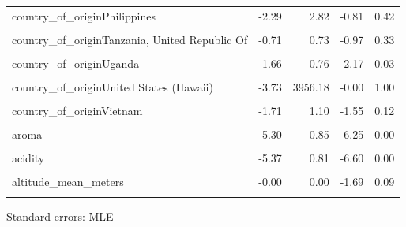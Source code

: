 \documentclass[
  letterpaper,
  DIV=11,
  numbers=noendperiod]{scrartcl}
\begin{document}
\begin{table}[!h]
\begin{threeparttable}
\begin{tabular}{lrrrr}
country\_of\_originPhilippines & -2.29 & 2.82 & -0.81 & 0.42\\
\cellcolor{gray!10}{country\_of\_originTaiwan} & \cellcolor{gray!10}{-0.50} & \cellcolor{gray!10}{0.62} & \cellcolor{gray!10}{-0.81} & \cellcolor{gray!10}{0.42}\\
\addlinespace
country\_of\_originTanzania, United Republic Of & -0.71 & 0.73 & -0.97 & 0.33\\
\cellcolor{gray!10}{country\_of\_originThailand} & \cellcolor{gray!10}{-2.17} & \cellcolor{gray!10}{0.96} & \cellcolor{gray!10}{-2.26} & \cellcolor{gray!10}{0.02}\\
country\_of\_originUganda & 1.66 & 0.76 & 2.17 & 0.03\\
\cellcolor{gray!10}{country\_of\_originUnited States} & \cellcolor{gray!10}{-1.67} & \cellcolor{gray!10}{1.77} & \cellcolor{gray!10}{-0.94} & \cellcolor{gray!10}{0.35}\\
country\_of\_originUnited States (Hawaii) & -3.73 & 3956.18 & -0.00 & 1.00\\
\addlinespace
\cellcolor{gray!10}{country\_of\_originUnited States (Puerto Rico)} & \cellcolor{gray!10}{2.91} & \cellcolor{gray!10}{1.66} & \cellcolor{gray!10}{1.75} & \cellcolor{gray!10}{0.08}\\
country\_of\_originVietnam & -1.71 & 1.10 & -1.55 & 0.12\\
\cellcolor{gray!10}{country\_of\_originZambia} & \cellcolor{gray!10}{13.40} & \cellcolor{gray!10}{3956.18} & \cellcolor{gray!10}{0.00} & \cellcolor{gray!10}{1.00}\\
aroma & -5.30 & 0.85 & -6.25 & 0.00\\
\cellcolor{gray!10}{flavor} & \cellcolor{gray!10}{-7.91} & \cellcolor{gray!10}{1.02} & \cellcolor{gray!10}{-7.72} & \cellcolor{gray!10}{0.00}\\
\addlinespace
acidity & -5.37 & 0.81 & -6.60 & 0.00\\
\cellcolor{gray!10}{category\_two\_defects} & \cellcolor{gray!10}{-0.06} & \cellcolor{gray!10}{0.04} & \cellcolor{gray!10}{-1.49} & \cellcolor{gray!10}{0.14}\\
altitude\_mean\_meters & -0.00 & 0.00 & -1.69 & 0.09\\
\cellcolor{gray!10}{harvested} & \cellcolor{gray!10}{-0.14} & \cellcolor{gray!10}{0.08} & \cellcolor{gray!10}{-1.80} & \cellcolor{gray!10}{0.07}\\
\bottomrule
\end{tabular}
\begin{tablenotes}
\item Standard errors: MLE
\end{tablenotes}
\end{threeparttable}
\end{table}
\end{document}
